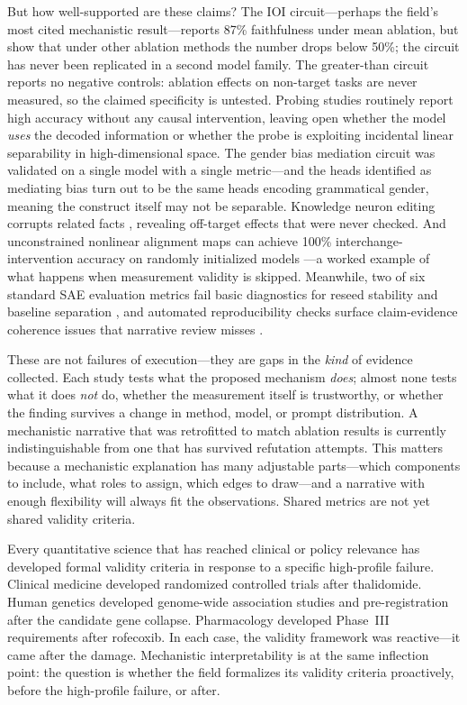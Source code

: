 \documentclass{article}
\begin{document}
But how well-supported are these claims? The IOI circuit---perhaps the field's most cited
mechanistic result---reports 87\% faithfulness under mean ablation, but
\citet{miller2024transformer} show that under other ablation methods the number drops below
50\%; the circuit has never been replicated in a second model family. The greater-than
circuit reports no negative controls: ablation effects on non-target tasks are never
measured, so the claimed specificity is untested. Probing studies routinely report high
accuracy without any causal intervention, leaving open whether the model \emph{uses} the
decoded information or whether the probe is exploiting incidental linear separability in
high-dimensional space. The gender bias mediation circuit was validated on a single model
with a single metric---and the heads identified as mediating bias turn out to be the same
heads encoding grammatical gender, meaning the construct itself may not be separable.
Knowledge neuron editing corrupts related facts \citep{dai2022knowledge}, revealing
off-target effects that were never checked. And unconstrained nonlinear alignment maps can
achieve 100\% interchange-intervention accuracy on randomly initialized models
\citep{sutter2025nonlinear}---a worked example of what happens when measurement validity is
skipped. Meanwhile, two of six standard SAE evaluation metrics fail basic diagnostics for
reseed stability and baseline separation \citep{karvonen2025saebench}, and automated
reproducibility checks surface claim-evidence coherence issues that narrative review misses
\citep{bai2026mecheval}.

These are not failures of execution---they are gaps in the \emph{kind} of evidence
collected. Each study tests what the proposed mechanism \emph{does}; almost none tests what
it does \emph{not} do, whether the measurement itself is trustworthy, or whether the
finding survives a change in method, model, or prompt distribution. A mechanistic
narrative that was retrofitted to match ablation results is currently indistinguishable
from one that has survived refutation attempts. This matters because a mechanistic
explanation has many adjustable parts---which components to include, what roles to assign,
which edges to draw---and a narrative with enough flexibility will always fit the
observations. Shared metrics are not yet shared validity criteria.

Every quantitative science that has reached clinical or policy relevance has developed formal validity criteria in response to a specific high-profile failure. Clinical medicine developed randomized controlled trials after thalidomide. Human genetics developed genome-wide association studies and pre-registration after the candidate gene collapse. Pharmacology developed Phase~III requirements after rofecoxib. In each case, the validity framework was reactive---it came after the damage. Mechanistic interpretability is at the same inflection point: the question is whether the field formalizes its validity criteria proactively, before the high-profile failure, or after.
\end{document}
